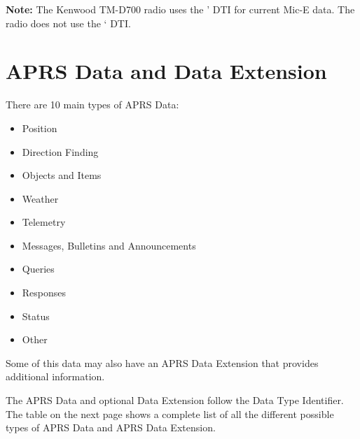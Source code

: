 
\textbf{Note:} The Kenwood TM-D700 radio uses the ' DTI for current Mic-E data.
The radio does not use the ‘ DTI.

\clearpage

\section{APRS Data and Data Extension}



There are 10 main types of APRS Data:

\begin {itemize}

\item Position
\item Direction Finding
\item Objects and Items
\item Weather
\item Telemetry
\item Messages, Bulletins and Announcements
\item Queries
\item Responses
\item Status
\item Other

\end{itemize}

Some of this data may also have an APRS Data Extension that provides
additional information.

The APRS Data and optional Data Extension follow the Data Type Identifier.
The table on the next page shows a complete list of all the different possible
types of APRS Data and APRS Data Extension.

\newpage


